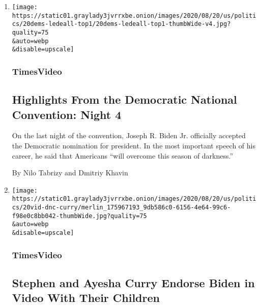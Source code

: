 \begin{enumerate}
\def\labelenumi{\arabic{enumi}.}
\item
  \href{/video/us/politics/100000007299516/democratic-national-convention-highlights.html}{}

  \texttt{[image: https://static01.graylady3jvrrxbe.onion/images/2020/08/20/us/politics/20dems-ledeall-top1/20dems-ledeall-top1-thumbWide-v4.jpg?quality=75\\\&auto=webp\\\&disable=upscale]}

  \hypertarget{timesvideo}{%
  \subsubsection{TimesVideo}\label{timesvideo}}

  \hypertarget{highlights-from-the-democratic-national-convention-night-4}{%
  \subsection{Highlights From the Democratic National Convention: Night
  4}\label{highlights-from-the-democratic-national-convention-night-4}}

  On the last night of the convention, Joseph R. Biden Jr. officially
  accepted the Democratic nomination for president. In the most
  important speech of his career, he said that Americans ``will overcome
  this season of darkness.''

  By Nilo Tabrizy and Dmitriy Khavin
\item
  \href{/video/us/elections/100000007299782/stephen-curry-speaks-dnc.html}{}

  \texttt{[image: https://static01.graylady3jvrrxbe.onion/images/2020/08/20/us/politics/20vid-dnc-curry/merlin\_175967193\_9db586c0-6156-4e64-99c6-f98e0c8bb042-thumbWide.jpg?quality=75\\\&auto=webp\\\&disable=upscale]}

  \hypertarget{timesvideo-1}{%
  \subsubsection{TimesVideo}\label{timesvideo-1}}

  \hypertarget{stephen-and-ayesha-curry-endorse-biden-in-video-with-their-children}{%
  \subsection{Stephen and Ayesha Curry Endorse Biden in Video With Their
  Children}\label{stephen-and-ayesha-curry-endorse-biden-in-video-with-their-children}}


\end{enumerate}
